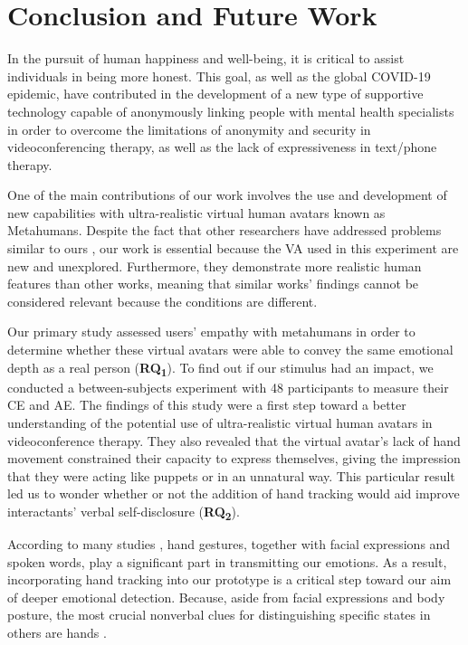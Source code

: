 \section{Conclusion and Future Work}
In the pursuit of human happiness and well-being, it is critical to assist individuals in being more honest. This goal, as well as the global COVID-19 epidemic, have contributed in the development of a new type of supportive technology capable of anonymously linking people with mental health specialists in order to overcome the limitations of anonymity and security in videoconferencing therapy, as well as the lack of expressiveness in text/phone therapy. 

One of the main contributions of our work involves the use and development of new capabilities with ultra-realistic virtual human avatars known as Metahumans. Despite the fact that other researchers have addressed problems similar to ours \cite{LU21, ZAL18, GRA07, LUC14, ROT19, KAN16, KAN10A, BAC19}, our work is essential because the VA used in this experiment are new and unexplored. Furthermore, they demonstrate more realistic human features than other works, meaning that similar works' findings cannot be considered relevant because the conditions are different.

Our primary study assessed users' empathy with metahumans in order to determine whether these virtual avatars were able to convey the same emotional depth as a real person (\textbf{RQ\textsubscript{1}}). To find out if our stimulus had an impact, we conducted a between-subjects experiment with 48 participants to measure their CE and AE. The findings of this study were a first step toward a better understanding of the potential use of ultra-realistic virtual human avatars in videoconference therapy. They also revealed that the virtual avatar's lack of hand movement constrained their capacity to express themselves, giving the impression that they were acting like puppets or in an unnatural way. This particular result led us to wonder whether or not the addition of hand tracking would aid improve interactants' verbal self-disclosure (\textbf{RQ\textsubscript{2}}).

According to many studies \cite{ARJ20, WAX97, REI22}, hand gestures, together with facial expressions and spoken words, play a significant part in transmitting our emotions. As a result, incorporating hand tracking into our prototype is a critical step toward our aim of deeper emotional detection. Because, aside from facial expressions and body posture, the most crucial nonverbal clues for distinguishing specific states in others are hands \cite{WAX97, REI22}.

